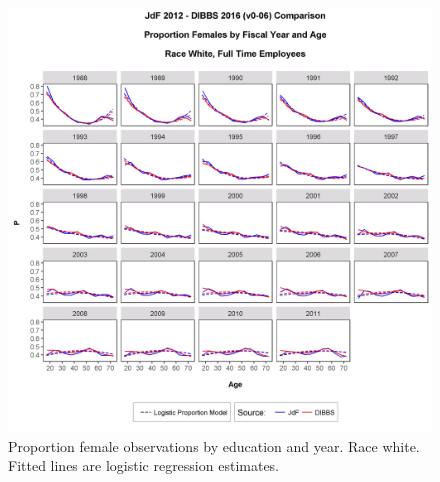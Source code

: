 \documentclass[10pt, letterpaper]{article}
\begin{document}
\begin{spacing}{1.0}
\begin{figure}[h]
\centering
\includegraphics[width=6.5in, trim={0 0 0 1in}, clip]{GenderProportionLogisticModelFYRaceAgeEv0-06.png}
\caption{Proportion female observations by education and year.  Race white.  Fitted lines are logistic regression estimates.}
\label{figure:GenderProportionLogisticModelFYRaceAgeE}
\end{figure}

\clearpage





\end{spacing}
  
\end{document}

